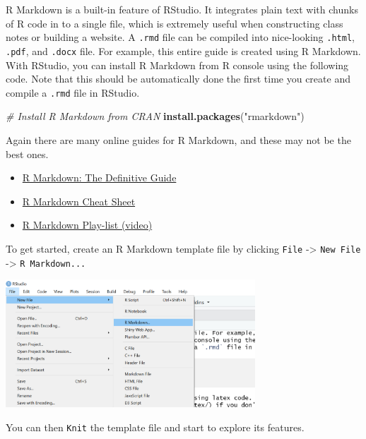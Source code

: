 \documentclass[
]{book}
\newenvironment{Shaded}{\begin{snugshade}}{\end{snugshade}}
\newcommand{\CommentTok}[1]{\textcolor[rgb]{0.56,0.35,0.01}{\textit{#1}}}
\newcommand{\KeywordTok}[1]{\textcolor[rgb]{0.13,0.29,0.53}{\textbf{#1}}}
\newcommand{\NormalTok}[1]{#1}
\newcommand{\StringTok}[1]{\textcolor[rgb]{0.31,0.60,0.02}{#1}}
\providecommand{\tightlist}{%
  \setlength{\itemsep}{0pt}\setlength{\parskip}{0pt}}
\begin{document}
R Markdown is a built-in feature of RStudio. It integrates plain text with chunks of R code in to a single file, which is extremely useful when constructing class notes or building a website. A \texttt{.rmd} file can be compiled into nice-looking \texttt{.html}, \texttt{.pdf}, and \texttt{.docx} file. For example, this entire guide is created using R Markdown. With RStudio, you can install R Markdown from R console using the following code. Note that this should be automatically done the first time you create and compile a \texttt{.rmd} file in RStudio.

\begin{Shaded}
\begin{Highlighting}[]
  \CommentTok{# Install R Markdown from CRAN}
  \KeywordTok{install.packages}\NormalTok{(}\StringTok{"rmarkdown"}\NormalTok{)}
\end{Highlighting}
\end{Shaded}

Again there are many online guides for R Markdown, and these may not be the best ones.

\begin{itemize}
\tightlist
\item
  \href{https://bookdown.org/yihui/rmarkdown/}{R Markdown: The Definitive Guide}
\item
  \href{https://www.rstudio.com/wp-content/uploads/2015/02/rmarkdown-cheatsheet.pdf}{R Markdown Cheat Sheet}
\item
  \href{https://www.youtube.com/playlist?list=PLBgxzZMu3GpNgd07DwmS-2odHtMO6MWGH}{R Markdown Play-list (video)}
\end{itemize}

To get started, create an R Markdown template file by clicking \texttt{File} -\textgreater{} \texttt{New\ File} -\textgreater{} \texttt{R\ Markdown...}

\includegraphics[width=0.7\textwidth,height=\textheight]{images/Create.png}

You can then \texttt{Knit} the template file and start to explore its features.
\end{document}
